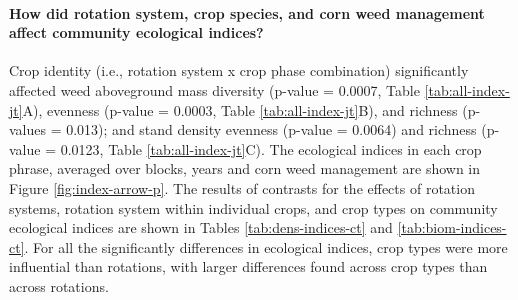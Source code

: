 \documentclass[
]{article}
\author{}
\date{\vspace{-2.5em}}
\begin{document}
\hypertarget{how-did-rotation-system-crop-species-and-corn-weed-management-affect-community-ecological-indices}{%
\paragraph*{How did rotation system, crop species, and corn weed management affect community ecological indices?}\label{how-did-rotation-system-crop-species-and-corn-weed-management-affect-community-ecological-indices}}

Crop identity (i.e., rotation system x crop phase combination) significantly affected weed aboveground mass diversity (p-value = 0.0007, Table \ref{tab:all-index-jt}A), evenness (p-value = 0.0003, Table \ref{tab:all-index-jt}B), and richness (p-values = 0.013); and stand density evenness (p-value = 0.0064) and richness (p-value = 0.0123, Table \ref{tab:all-index-jt}C). The ecological indices in each crop phrase, averaged over blocks, years and corn weed management are shown in Figure \ref{fig:index-arrow-p}. The results of contrasts for the effects of rotation systems, rotation system within individual crops, and crop types on community ecological indices are shown in Tables \ref{tab:dens-indices-ct} and \ref{tab:biom-indices-ct}. For all the significantly differences in ecological indices, crop types were more influential than rotations, with larger differences found across crop types than across rotations.
\end{document}
